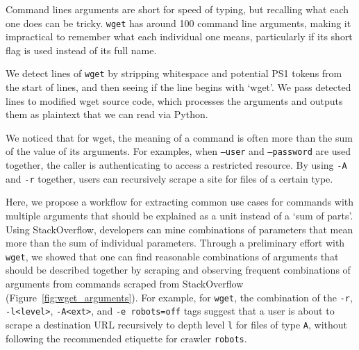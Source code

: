 \begin{figure}
\end{figure}

Command lines arguments are short for speed of typing, but recalling what each one does can be tricky.
\texttt{wget} has around 100 command line arguments, making it impractical to remember what each individual one means, particularly if its short flag is used instead of its full name.

We detect lines of \texttt{wget} by stripping whitespace and potential PS1  tokens from the start of lines, and then seeing if the line begins with `wget'.
We pass detected lines to modified wget source code, which processes the arguments and outputs them as plaintext that we can read via Python.

We noticed that for wget, the meaning of a command is often more than the sum of the value of its arguments.
For examples, when \texttt{--user} and \texttt{--password} are used together, the caller is authenticating to access a restricted resource.
By using \texttt{-A} and \texttt{-r} together, users can recursively scrape a site for files of a certain type.

Here, we propose a workflow for extracting common use cases for commands with multiple arguments that should be explained as a unit instead of a `sum of parts'.
Using StackOverflow, developers can mine combinations of parameters that mean more than the sum of individual parameters.
Through a preliminary effort with \texttt{wget}, we showed that one can find reasonable combinations of arguments that should be described together by scraping and observing frequent combinations of arguments from commands scraped from StackOverflow  (Figure~\ref{fig:wget_arguments}).
For example, for \texttt{wget}, the combination of the \texttt{-r}, \texttt{-l<level>}, \texttt{-A<ext>}, and \texttt{-e robots=off} tags suggest that a user is about to scrape a destination URL recursively to depth level \texttt{l} for files of type \texttt{A}, without following the recommended etiquette for crawler \texttt{robots}.

